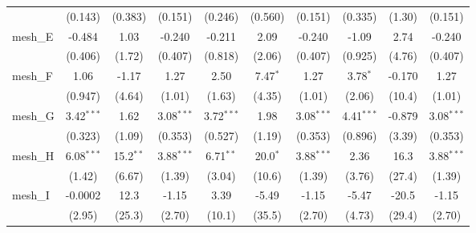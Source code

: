 \begin{tabular}{lccccccccc}
                                                               & (0.143)       & (0.383)       & (0.151)       & (0.246)        & (0.560)      & (0.151)       & (0.335)       & (1.30)         & (0.151)\\   
   mesh\_E                                                     & -0.484        & 1.03          & -0.240        & -0.211         & 2.09         & -0.240        & -1.09         & 2.74           & -0.240\\   
                                                               & (0.406)       & (1.72)        & (0.407)       & (0.818)        & (2.06)       & (0.407)       & (0.925)       & (4.76)         & (0.407)\\   
   mesh\_F                                                     & 1.06          & -1.17         & 1.27          & 2.50           & 7.47$^{*}$   & 1.27          & 3.78$^{*}$    & -0.170         & 1.27\\   
                                                               & (0.947)       & (4.64)        & (1.01)        & (1.63)         & (4.35)       & (1.01)        & (2.06)        & (10.4)         & (1.01)\\   
   mesh\_G                                                     & 3.42$^{***}$  & 1.62          & 3.08$^{***}$  & 3.72$^{***}$   & 1.98         & 3.08$^{***}$  & 4.41$^{***}$  & -0.879         & 3.08$^{***}$\\   
                                                               & (0.323)       & (1.09)        & (0.353)       & (0.527)        & (1.19)       & (0.353)       & (0.896)       & (3.39)         & (0.353)\\   
   mesh\_H                                                     & 6.08$^{***}$  & 15.2$^{**}$   & 3.88$^{***}$  & 6.71$^{**}$    & 20.0$^{*}$   & 3.88$^{***}$  & 2.36          & 16.3           & 3.88$^{***}$\\   
                                                               & (1.42)        & (6.67)        & (1.39)        & (3.04)         & (10.6)       & (1.39)        & (3.76)        & (27.4)         & (1.39)\\   
   mesh\_I                                                     & -0.0002       & 12.3          & -1.15         & 3.39           & -5.49        & -1.15         & -5.47         & -20.5          & -1.15\\   
                                                               & (2.95)        & (25.3)        & (2.70)        & (10.1)         & (35.5)       & (2.70)        & (4.73)        & (29.4)         & (2.70)\\   

\end{tabular}
